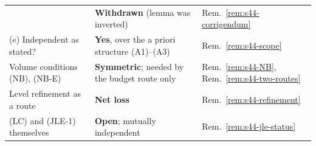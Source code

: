 \documentclass[11pt]{article}
\theoremstyle{definition}
\theoremstyle{remark}
\begin{document}
\begin{center}
\begin{tabular}{lll}
  & \textbf{Withdrawn} (lemma was inverted) & Rem.~\ref{rem:s44-corrigendum} \\
(e) Independent as stated?
  & \textbf{Yes}, over the a priori structure (A1)--(A3)
    & Rem.~\ref{rem:s44-scope} \\
Volume conditions (NB), (NB-E)
  & \textbf{Symmetric}; needed by the budget route only
    & Rem.~\ref{rem:s44-NB}, Rem.~\ref{rem:s44-two-routes} \\
Level refinement as a route
  & \textbf{Net loss} & Rem.~\ref{rem:s44-refinement} \\
(LC) and (JLE-1) themselves
  & \textbf{Open}; mutually independent & Rem.~\ref{rem:s44-jle-status} \\
\hline
\end{tabular}
\end{center}
\end{document}
